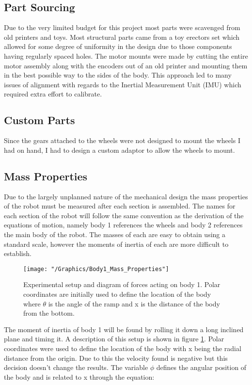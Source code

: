 \documentclass{article}
\begin{document}
	\subsection{Part Sourcing}
	Due to the very limited budget for this project most parts were scavenged from old printers and toys. Most structural parts came from a toy erectors set which allowed for some degree of uniformity in the design due to those components having regularly spaced holes. The motor mounts were made by cutting the entire motor assembly along with the encoders out of an old printer and mounting them in the best possible way to the sides of the body. This approach led to many issues of alignment with regards to the Inertial Measurement Unit (IMU) which required extra effort to calibrate. 	
	
		
	\subsection{Custom Parts}
	Since the gears attached to the wheels were not designed to mount the wheels I had on hand, I had to design a custom adaptor to allow the wheels to mount. 
	
	\subsection{Mass Properties}
	Due to the largely unplanned nature of the mechanical design the mass properties of the robot must be measured after each section is assembled. The names for each section of the robot will follow the same convention as the derivation of the equations of motion, namely body 1 references the wheels and body 2 references the main body of the robot. The masses of each are easy to obtain using a standard scale, however the moments of inertia of each are more difficult to establish.

	\begin{figure}[h]
		\centerline{\texttt{[image: "/Graphics/Body1\_Mass\_Properties"]}}
		\caption{Experimental setup and diagram of forces acting on body 1. Polar coordinates are initially used to define the location of the body where $\theta$ is the angle of the ramp and x is the distance of the body from the bottom.}
		\label{fig:Body1MassProps}
	\end{figure}		
	
	The moment of inertia of body 1 will be found by rolling it down a long inclined plane and timing it.	 A description of this setup is shown in figure \ref{fig:Body1MassProps}. Polar coordinates were used to define the location of the body with x being the radial distance from the origin. Due to this the velocity found is negative but this decision doesn't change the results. The variable $\phi$ defines the angular position of the body and is related to x through the equation: 
	
\end{document}
